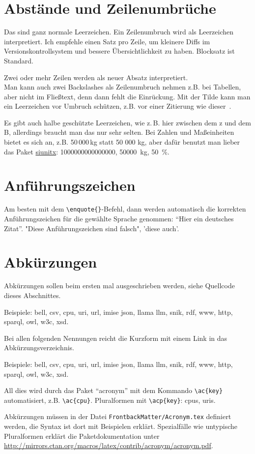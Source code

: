 \section{Abstände und Zeilenumbrüche}
Das sind ganz normale Leerzeichen.
Ein Zeilenumbruch wird als Leerzeichen interpretiert.
Ich empfehle einen Satz pro Zeile, um kleinere Diffs im Versionskontrollsystem und bessere Übersichtlichkeit zu haben.
Blocksatz ist Standard.



Zwei oder mehr Zeilen werden als neuer Absatz interpretiert.\\
Man kann auch zwei Backslashes als Zeilenumbruch nehmen z.B. bei Tabellen, aber nicht im Fließtext, denn dann fehlt die Einrückung.
Mit der Tilde kann man ein Leerzeichen vor Umbruch schützen, z.B. vor einer Zitierung wie dieser~\citep{sniktec}.

Es gibt auch halbe geschützte Leerzeichen, wie z.\,B. hier zwischen dem z und dem B, allerdings braucht man das nur sehr selten. Bei Zahlen und Maßeinheiten bietet es sich an, z.B. 50\,000\,kg statt 50 000 kg, aber dafür benutzt man lieber das Paket \href{http://mirrors.ctan.org/macros/latex/contrib/siunitx/siunitx.pdf}{siunitx}: \num{1000000000000000}, \SI{50000}{\kg}, \SI{50}{\%}.

\section{Anführungszeichen}
Am besten mit dem \verb+\enquote{}+-Befehl, dann werden automatisch die korrekten Anführungszeichen für die gewählte Sprache genommen: \enquote{Hier ein deutsches Zitat}.
"Diese Anführungszeichen sind falsch", 'diese auch'.

\section{Abkürzungen}
Abkürzungen sollen beim ersten mal ausgeschrieben werden, siehe Quellcode dieses Abschnittes.

Beispiele: \ac{bell}, \ac{csv}, \ac{cpu}, \ac{uri}, \ac{url}, \ac{imise} \ac{json}, \ac{llama} \ac{llm}, \ac{snik}, \ac{rdf}, \ac{www}, \ac{http}, \ac{sparql}, \ac{owl}, \ac{w3c}, \ac{xsd}.

Bei allen folgenden Nennungen reicht die Kurzform mit einem Link in das Abkürzungsverzeichnis.

Beispiele: \ac{bell}, \ac{csv}, \ac{cpu}, \ac{uri}, \ac{url}, \ac{imise} \ac{json}, \ac{llama} \ac{llm}, \ac{snik}, \ac{rdf}, \ac{www}, \ac{http}, \ac{sparql}, \ac{owl}, \ac{w3c}, \ac{xsd}.

All dies wird durch das Paket \enquote{acronym} mit dem Kommando \verb+\ac{key}+ automatisiert, z.B. \verb+\ac{cpu}+.
Pluralformen mit \verb+\acp{key}+: \acp{cpu}, \acp{uri}.

Abkürzungen müssen in der Datei \texttt{FrontbackMatter/Acronym.tex} definiert werden, die Syntax ist dort mit Beispielen erklärt.
Spezialfälle wie untypische Pluralformen erklärt die Paketdokumentation unter \url{http://mirrors.ctan.org/macros/latex/contrib/acronym/acronym.pdf}.
